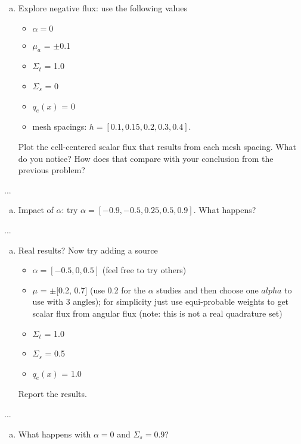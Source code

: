 \documentclass[10pt]{article}
\begin{document}
\begin{enumerate}[(a)]
\item Explore negative flux: use the following values
\begin{itemize}
\setlength\itemsep{0em}
\item $\alpha = 0$
\item $\mu_a$ = $\pm$0.1
\item $\Sigma_t$ = 1.0
\item $\Sigma_s$ = 0
\item $q_e(x)$ = 0
\item mesh spacings: $h = [0.1, 0.15, 0.2, 0.3, 0.4]$.
\end{itemize}
Plot the cell-centered scalar flux that results from each mesh spacing. What do you notice? How does that compare with your conclusion from the previous problem?
\end{enumerate}

...



\begin{enumerate}[(b)]
\item Impact of $\alpha$: try $\alpha = [-0.9, -0.5, 0.25, 0.5, 0.9]$. What happens?
\end{enumerate}

...



\begin{enumerate}[(c)]
\item Real results? Now try adding a source
\begin{itemize}
\setlength\itemsep{0em}
\item $\alpha = [-0.5, 0, 0.5]$ (feel free to try others)
\item $\mu$ = $\pm$[0.2, 0.7] (use 0.2 for the $\alpha$ studies and then choose one $alpha$ to use with 3 angles); for simplicity just use equi-probable weights to get scalar flux from angular flux (note: this is not a real quadrature set)
\item $\Sigma_t$ = 1.0
\item $\Sigma_s$ = 0.5
\item $q_e(x)$ = 1.0
\end{itemize}
Report the results.
\end{enumerate}

...



\begin{enumerate}[(d)]
\item What happens with $\alpha = 0$ and $\Sigma_s = 0.9$?
\end{enumerate}
\end{document}
